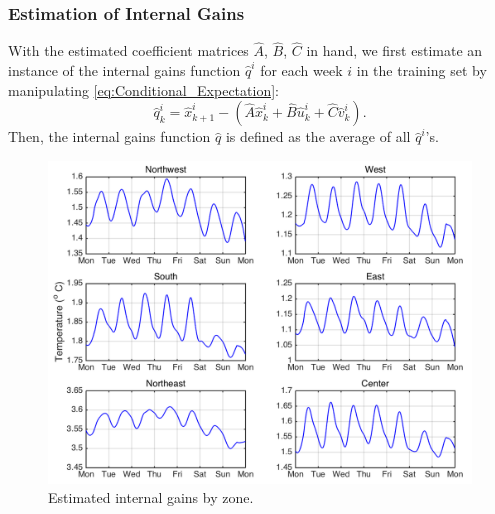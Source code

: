 
\subsubsection{Estimation of Internal Gains}
With the estimated coefficient matrices $\hat{A}$, $\hat{B}$, $\hat{C}$ in hand, we first estimate an instance of the internal gains function $\hat{q}^i$ for each week $i$ in the training set by manipulating \eqref{eq:Conditional_Expectation}:
\begin{equation}\label{eq:qig_estimation}
\hat{q}_k^i = \hat{x}_{k+1}^i - \left(\hat{A}\hat{x}_k^i + \hat{B}\hat{u}_k^i + \hat{C}\hat{v}_k^i\right).
\end{equation}
Then, the internal gains function $\hat{q}$ is defined as the average of all $\hat{q}^i$'s.

\begin{figure}[t]
\centering
\includegraphics[scale=0.40]{chapters/building_exp/figures/data_indiv_qig_fall.png}
\caption{Estimated internal gains by zone.}
\label{fig:qig}
\vspace*{-0.25cm}
\end{figure}

